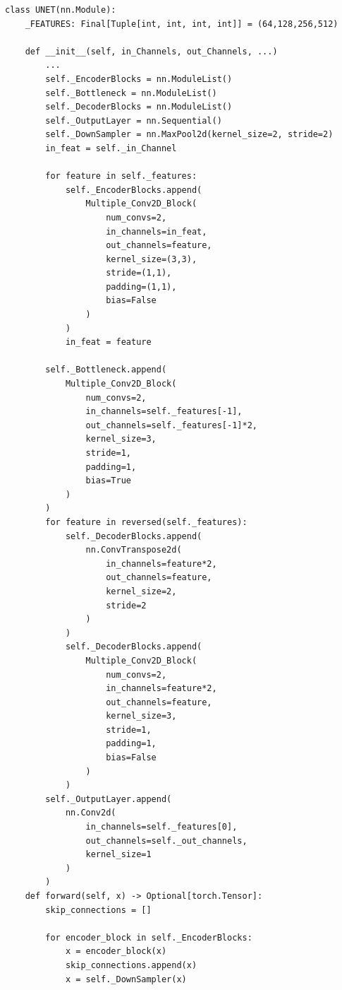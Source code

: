 \begin{lstlisting}
class UNET(nn.Module):
    _FEATURES: Final[Tuple[int, int, int, int]] = (64,128,256,512)

    def __init__(self, in_Channels, out_Channels, ...)
        ...
        self._EncoderBlocks = nn.ModuleList()
        self._Bottleneck = nn.ModuleList()
        self._DecoderBlocks = nn.ModuleList()
        self._OutputLayer = nn.Sequential()
        self._DownSampler = nn.MaxPool2d(kernel_size=2, stride=2)
        in_feat = self._in_Channel
        
        for feature in self._features:
            self._EncoderBlocks.append(
                Multiple_Conv2D_Block(
                    num_convs=2,
                    in_channels=in_feat, 
                    out_channels=feature, 
                    kernel_size=(3,3), 
                    stride=(1,1), 
                    padding=(1,1),
                    bias=False
                )
            )
            in_feat = feature
            
        self._Bottleneck.append(
            Multiple_Conv2D_Block(
                num_convs=2,
                in_channels=self._features[-1],
                out_channels=self._features[-1]*2,
                kernel_size=3,
                stride=1,
                padding=1,
                bias=True
            )
        )
        for feature in reversed(self._features):
            self._DecoderBlocks.append(
                nn.ConvTranspose2d(
                    in_channels=feature*2,
                    out_channels=feature,
                    kernel_size=2,
                    stride=2
                )
            )
            self._DecoderBlocks.append(
                Multiple_Conv2D_Block(
                    num_convs=2,
                    in_channels=feature*2,
                    out_channels=feature,
                    kernel_size=3,
                    stride=1,
                    padding=1,
                    bias=False
                )
            )
        self._OutputLayer.append(
            nn.Conv2d(
                in_channels=self._features[0],
                out_channels=self._out_channels,
                kernel_size=1
            )
        )
    def forward(self, x) -> Optional[torch.Tensor]:
        skip_connections = []
        
        for encoder_block in self._EncoderBlocks:
            x = encoder_block(x)
            skip_connections.append(x)
            x = self._DownSampler(x)


\end{lstlisting}
